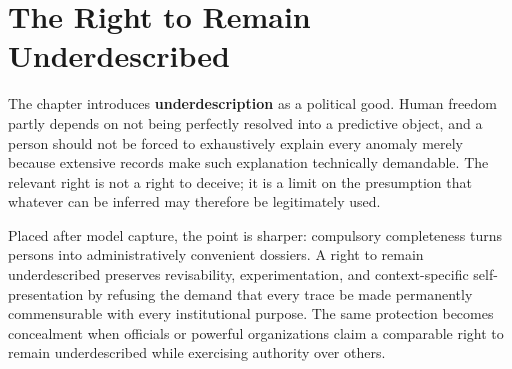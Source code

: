
\chapter{The Right to Remain Underdescribed}
\label{ch:ch033}

The chapter introduces \textbf{underdescription} as a political good. Human freedom partly depends on not being perfectly resolved into a predictive object, and a person should not be forced to exhaustively explain every anomaly merely because extensive records make such explanation technically demandable. The relevant right is not a right to deceive; it is a limit on the presumption that whatever can be inferred may therefore be legitimately used.

Placed after model capture, the point is sharper: compulsory completeness turns persons into administratively convenient dossiers. A right to remain underdescribed preserves revisability, experimentation, and context-specific self-presentation by refusing the demand that every trace be made permanently commensurable with every institutional purpose. The same protection becomes concealment when officials or powerful organizations claim a comparable right to remain underdescribed while exercising authority over others.
